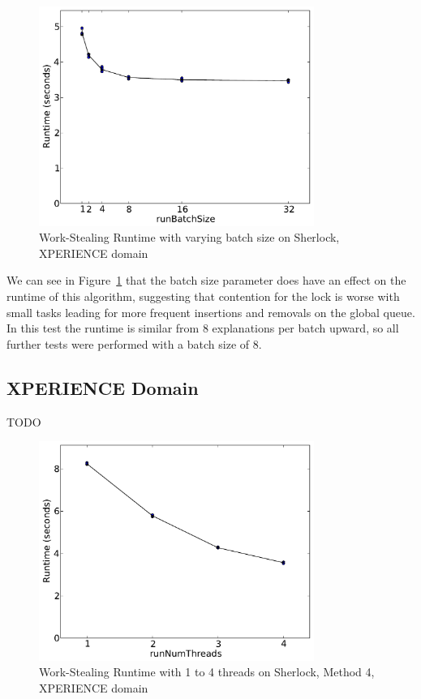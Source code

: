 \documentclass[12pt,twoside,abbrevs,msc,ai,notimes,logo,sansheadings]{infthesis}
\begin{document}
  \begin{figure}[!htbp]
  \begin{centering}
  \includegraphics[width=0.8\textwidth]{images/batch-xper5-sherlock-4-1}
  \par\end{centering}
  \caption{Work-Stealing Runtime with varying batch size on Sherlock, XPERIENCE domain}
  \label{fig:batch-4}
  \end{figure}
  
  We can see in Figure~\ref{fig:batch-4} that the batch size parameter does have an effect on the runtime of this algorithm, suggesting that contention for the lock is worse with small tasks leading for more frequent insertions and removals on the global queue. In this test the runtime is similar from 8 explanations per batch upward, so all further tests were performed with a batch size of 8.
  
  \subsection{XPERIENCE Domain}
  TODO
  
  \begin{figure}[!htbp]
  \begin{centering}
  \includegraphics[width=0.8\textwidth]{images/threads-xper5-sherlock-4-1}
  \par\end{centering}
  \caption{Work-Stealing Runtime with 1 to 4 threads on Sherlock, Method 4, XPERIENCE domain}
  \end{figure}
  
\end{document}
